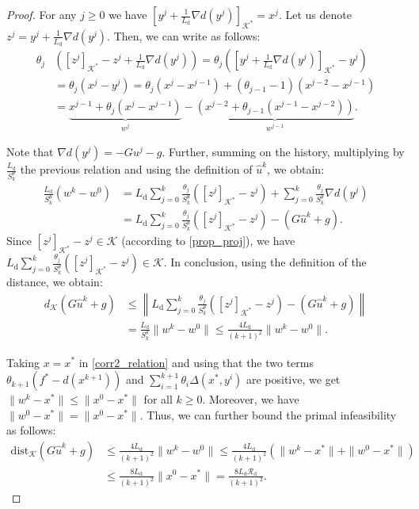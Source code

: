 \documentclass{gOMS2e}
\theoremstyle{plain}
\theoremstyle{definition}
\theoremstyle{remark}
\providecommand{\norm}[1]{\lVert#1\rVert}
\begin{document}
\begin{proof}  For any $j \ge 0$ we have $\left[ y^{j} +
\frac{1}{L_{\text{d}}}\nabla d(y^{j}) \right]_{\mathcal{K}^*}
=x^{j}.$ Let us  denote $z^j = y^{j} + \frac{1}{L_{\text{d}}}\nabla
d(y^{j})$.   Then, we can write as follows:
\begin{align} \label{feasibility_aux1}
\theta_j & \left( [z^j]_{\mathcal{K}^*} - z^j + \frac{1}{L_{\text{d}}}\nabla  d(y^j) \right) = \theta_j \left(\left[ y^{j} + \frac{1}{L_{\text{d}}}\nabla d(y^{j}) \right]_{\mathcal{K}^*} - y^{j} \right) \nonumber\\
& =  \theta_{j} (x^{j} - y^{j})  = \theta_{j}(x^{j} - x^{j-1}) + (\theta_{j-1} -1)(x^{j-2} - x^{j-1})\nonumber\\
& = \underbrace{x^{j-1} + \theta_{j}(x^{j}-x^{j-1})}_{w^{j}} -
\underbrace{(x^{j-2} + \theta_{j-1}(x^{j-1}-x^{j-2}))}_{w^{j-1}}.
\end{align}

\noindent Note that  $\nabla d(y^j) = - G u^j - g$.  Further, summing on the history,  multiplying by $\frac{L_{\text{d}}}{S_k^\theta}$ the previous relation and using  the definition of $\hat u^k$, we obtain:
\begin{align*}
\frac{L_\text{d}}{S_k^\theta} (w^{k}-w^0) & = L_{\text{d}}\sum\limits_{j=0}^k  \frac{\theta_j}{S_k^\theta}([z^j]_{\mathcal{K}^*} - z^j) +
\sum\limits_{j=0}^k  \frac{\theta_j}{S_k^\theta}  \nabla d(y^j) \\
& = L_{\text{d}}\sum\limits_{j=0}^k  \frac{\theta_j}{S_k^\theta}([z^j]_{\mathcal{K}^*} - z^j) - (G \hat u^k + g).
\end{align*}
Since   $[z^j]_{\mathcal{K^*}} - z^j \in \mathcal{K}$ (according to \eqref{prop_proj}), we have $L_{\text{d}}\sum\limits_{j=0}^k  \frac{\theta_j}{S_k^\theta}([z^j]_{\mathcal{K}^*} - z^j) \in {\mathcal{K}}$. In conclusion, using the definition of the distance, we obtain:
\begin{align*}
d_{\mathcal{K}}(G\hat{u}^k + g) & \le \left\| L_{\text{d}}\sum\limits_{j=0}^k  \frac{\theta_j}{S_k^\theta}([z^j]_{\mathcal{K}^*} - z^j) - (G \hat u^k + g)  \right\| \\
&= \frac{L_\text{d}}{S_k^\theta}\norm{w^{k}-w^0} \le
\frac{4L_\text{d}}{(k+1)^2} \norm{w^k -w^{0}}.
\end{align*}

\noindent Taking $x=x^*$ in \eqref{corr2_relation} and using
 that the two  terms $\theta_{k+1}(f^*-d(x^{k+1}))$ and $\sum\limits_{i=1}^{k+1}\theta_{i}
 \Delta(x^*,y^i)$ are positive,
we get $\| w^k - x^* \| \le \| x^0 - x^* \|$ for all $k \geq 0$. Moreover, we have $\|w^0 - x^*\| = \| x^0 - x^*\|$. Thus, we can further bound the primal infeasibility as follows:
\begin{align}
\text{dist}_{\mathcal{K}}(G \hat{u}^k +g)    & \le
\frac{4L_\text{d}}{(k+1)^2} \|w^k - w^0\|
 \le \frac{4L_\text{d}}{(k+1)^2}(\|w^k - x^* \| + \|w^0 - x^*\|)  \nonumber\\
& \le \frac{8L_\text{d}}{(k+1)^2} \|x^0 - x^*\| = \frac{8L_\text{d}
\mathcal{R}_{\text{d}}}{(k+1)^2}.\label{infes_av}
\end{align}


\end{proof}
\end{document}

